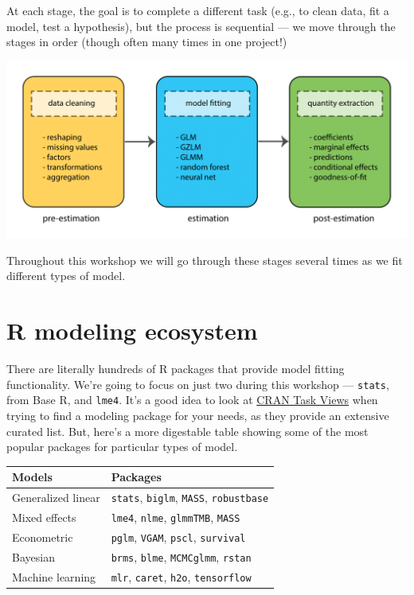 \documentclass[
]{book}
\begin{document}
At each stage, the goal is to complete a different task (e.g., to clean data, fit a model, test a hypothesis),
but the process is sequential --- we move through the stages in order (though often many times in one project!)

\includegraphics{R/Rmodels/images/R_model_pipeline.png}

Throughout this workshop we will go through these stages several times as we fit different types of model.

\hypertarget{r-modeling-ecosystem}{%
\section{R modeling ecosystem}\label{r-modeling-ecosystem}}

There are literally hundreds of R packages that provide model fitting functionality.
We're going to focus on just two during this workshop --- \texttt{stats}, from Base R, and
\texttt{lme4}. It's a good idea to look at \href{https://cran.r-project.org/web/views/}{CRAN Task Views}
when trying to find a modeling package for your needs, as they provide an extensive
curated list. But, here's a more digestable table showing some of the most popular
packages for particular types of model.

\begin{longtable}[]{@{}ll@{}}
\toprule
Models & Packages\tabularnewline
\midrule
\endhead
Generalized linear & \texttt{stats}, \texttt{biglm}, \texttt{MASS}, \texttt{robustbase}\tabularnewline
Mixed effects & \texttt{lme4}, \texttt{nlme}, \texttt{glmmTMB}, \texttt{MASS}\tabularnewline
Econometric & \texttt{pglm}, \texttt{VGAM}, \texttt{pscl}, \texttt{survival}\tabularnewline
Bayesian & \texttt{brms}, \texttt{blme}, \texttt{MCMCglmm}, \texttt{rstan}\tabularnewline
Machine learning & \texttt{mlr}, \texttt{caret}, \texttt{h2o}, \texttt{tensorflow}\tabularnewline
\bottomrule
\end{longtable}
\end{document}
